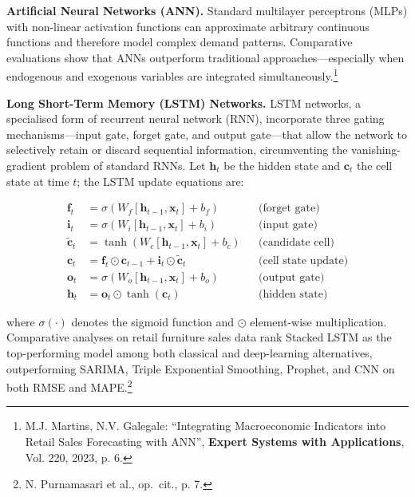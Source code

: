 \medskip
\noindent\textbf{Artificial Neural Networks (ANN).}
Standard multilayer perceptrons (MLPs) with non-linear activation functions
can approximate arbitrary continuous functions and therefore model complex
demand patterns. Comparative evaluations show that ANNs outperform
traditional approaches—especially when endogenous and exogenous variables
are integrated simultaneously.\footnote{M.J. Martins, N.V. Galegale:
``Integrating Macroeconomic Indicators into Retail Sales Forecasting with
ANN'', \textbf{Expert Systems with Applications}, Vol. 220, 2023, p. 6.}

\medskip
\noindent\textbf{Long Short-Term Memory (LSTM) Networks.}
LSTM networks, a specialised form of recurrent neural network (RNN),
incorporate three gating mechanisms—input gate, forget gate, and output
gate—that allow the network to selectively retain or discard sequential
information, circumventing the vanishing-gradient problem of standard RNNs.
Let $\mathbf{h}_t$ be the hidden state and $\mathbf{c}_t$ the cell state
at time $t$; the LSTM update equations are:

\begin{align}
  \mathbf{f}_t &= \sigma\!\left(W_f[\mathbf{h}_{t-1},\mathbf{x}_t]
                   + b_f\right) & &\text{(forget gate)} \\
  \mathbf{i}_t &= \sigma\!\left(W_i[\mathbf{h}_{t-1},\mathbf{x}_t]
                   + b_i\right) & &\text{(input gate)} \\
  \tilde{\mathbf{c}}_t &= \tanh\!\left(W_c[\mathbf{h}_{t-1},\mathbf{x}_t]
                   + b_c\right) & &\text{(candidate cell)} \\
  \mathbf{c}_t &= \mathbf{f}_t \odot \mathbf{c}_{t-1}
                   + \mathbf{i}_t \odot \tilde{\mathbf{c}}_t
                   & &\text{(cell state update)} \\
  \mathbf{o}_t &= \sigma\!\left(W_o[\mathbf{h}_{t-1},\mathbf{x}_t]
                   + b_o\right) & &\text{(output gate)} \\
  \mathbf{h}_t &= \mathbf{o}_t \odot \tanh(\mathbf{c}_t)
                   & &\text{(hidden state)}
\end{align}

\noindent where $\sigma(\cdot)$ denotes the sigmoid function and $\odot$
element-wise multiplication. Comparative analyses on retail furniture sales
data rank Stacked LSTM as the top-performing model among both classical and
deep-learning alternatives, outperforming SARIMA, Triple Exponential
Smoothing, Prophet, and CNN on both RMSE and
MAPE.\footnote{N. Purnamasari et al., op.\ cit., p. 7.}

